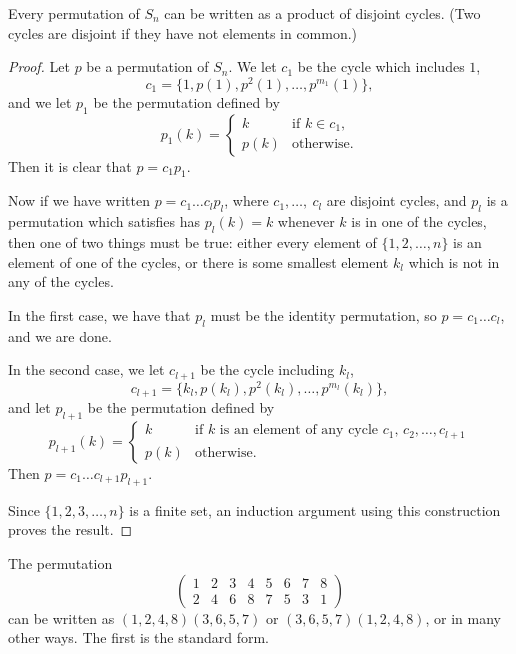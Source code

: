 \begin{theorem}
  Every permutation of $S_{n}$ can be written as a product of disjoint cycles.
  (Two cycles are disjoint if they have not elements in common.)
\end{theorem}
\begin{proof}
  Let $p$ be a permutation of $S_{n}$.  We let $c_{1}$ be the cycle which
  includes $1$,
  \[
    c_{1} = \{1, p(1), p^{2}(1), \ldots, p^{m_{1}}(1)\},
  \]
  and we let $p_{1}$ be the permutation defined by
  \[
    p_{1}(k) = \begin{cases}
      k & \text{if $k \in c_{1}$,}\\
      p(k) & \text{otherwise}.
    \end{cases}
  \]
  Then it is clear that $p = c_{1}p_{1}$.
  
  Now if we have written $p = c_{1}\ldots c_{l}p_{l}$, where $c_{1}, \ldots,\
  c_{l}$ are disjoint cycles, and $p_{l}$ is a permutation which satisfies
  has $p_{l}(k) = k$ whenever $k$ is in one of the cycles, then one of two
  things must be true: either every element of $\{1, 2, \ldots, n\}$ is an
  element of one of the cycles, or there is some smallest element $k_{l}$
  which is not in any of the cycles.
  
  In the first case, we have that $p_{l}$ must be the identity permutation,
  so $p = c_{1}\ldots c_{l}$, and we are done.
  
  In the second case, we let $c_{l+1}$ be the cycle including $k_{l}$,
  \[
    c_{l+1} = \{k_{l}, p(k_{l}), p^{2}(k_{l}), \ldots, p^{m_{l}}(k_{l})\},
  \]
  and let $p_{l+1}$ be the permutation defined by
  \[
    p_{l+1}(k) = \begin{cases}
      k & \text{if $k$ is an element of any cycle $c_{1}$, $c_{2}, \ldots, c_{l+1}$}\\
      p(k) & \text{otherwise}.
    \end{cases}
  \]
  Then $p = c_{1}\ldots c_{l+1}p_{l+1}$.
  
  Since $\{1,2,3,\ldots, n\}$ is a finite set, an induction argument using
  this construction proves the result.
\end{proof}

\begin{example}
  The permutation
  \[
    \begin{pmatrix}
      1 & 2 & 3 & 4 & 5 & 6 & 7 & 8 \\
      2 & 4 & 6 & 8 & 7 & 5 & 3 & 1
    \end{pmatrix}
  \]
  can be written as $(1, 2, 4, 8)(3, 6, 5, 7)$ or $(3, 6, 5, 7)(1, 2, 4, 8)$,
  or in many other ways.  The first is the standard form.
\end{example}

